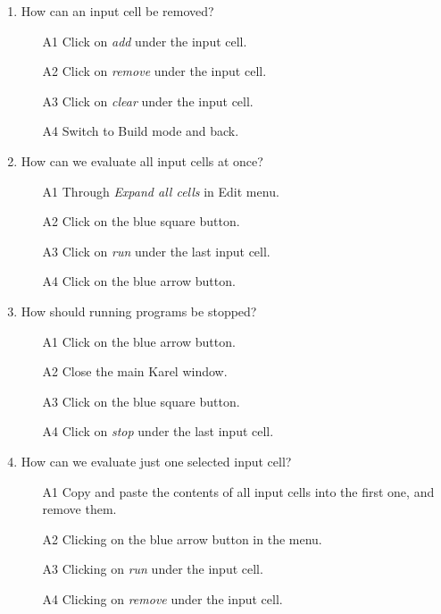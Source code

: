 \documentclass[article,A4,12pt]{llncs}
\begin{document}
{{{{\begin{enumerate}
\begin{enumerate}
\item[A3] By clicking on the bracket on the right of the cell.
\item[A4] By clicking on {\em collapse} under the cell.
\end{enumerate}
\item How can an input cell be removed?
\begin{enumerate}
\item[A1] Click on {\em add} under the input cell.
\item[A2] Click on {\em remove} under the input cell.
\item[A3] Click on {\em clear} under the input cell.
\item[A4] Switch to Build mode and back.
\end{enumerate}
\item How can we evaluate all input cells at once?
\begin{enumerate}
\item[A1] Through {\em Expand all cells} in Edit menu.
\item[A2] Click on the blue square button.
\item[A3] Click on {\em run} under the last input cell.
\item[A4] Click on the blue arrow button.
\end{enumerate}
\item How should running programs be stopped?
\begin{enumerate}
\item[A1] Click on the blue arrow button.
\item[A2] Close the main Karel window.
\item[A3] Click on the blue square button.
\item[A4] Click on {\em stop} under the last input cell.
\end{enumerate}
\item How can we evaluate just one selected input cell?
\begin{enumerate}
\item[A1] Copy and paste the contents of all 
          input cells into the first one, and remove them.
\item[A2] Clicking on the blue arrow button in the menu. 
\item[A3] Clicking on {\em run} under the input cell.
\item[A4] Clicking on {\em remove} under the input cell.
\end{enumerate}
\end{enumerate}




}}}}
\end{document}
